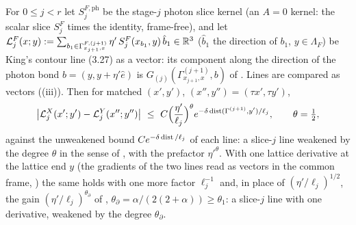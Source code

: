 \begin{lemma}\label{rot:hyb:lem:CLN}
For $0\le j<r$ let $S^{F,\mathrm{ph}}_j$ be the stage-$j$ photon slice kernel (an $A=0$ kernel: the scalar slice $S^F_j$ times the identity, frame-free), and let $\mathcal L^F_j(x;y):=\sum_{b_1\in\Gamma^{F,(j+1)}_{x_{j+1},x}}\eta'\,S^F_j(x_{b_1},y)\,\hat b_1\in\mathbb R^3$ ($\hat b_1$ the direction of $b_1$, $y\in\Lambda_F$) be King's contour line (3.27) as a vector: its component along the direction of the photon bond $b=(y,y+\eta'\hat e)$ is $G_{(j)}(\Gamma^{(j+1)}_{x_{j+1},x},b)$ of \cite[(3.27)]{K1}. Lines are compared as vectors ((iii)). Then for matched $(x',y')$, $(x'',y'')=(\tau x',\tau y')$,
\[
\big|\cL^X_j(x';y')-\cL^Y_j(x'';y'')\big|\ \le\ C\Big(\frac{\eta'}{\ell_j}\Big)^{\theta}e^{-\delta\dist(\Gamma^{(j+1)},y')/\ell_j},\qquad\theta=\tfrac12,
\]
against the unweakened bound $Ce^{-\delta\operatorname{dist}/\ell_j}$ of each line: a slice-$j$ line weakened by the degree $\theta$ in the sense of , with the prefactor $\eta'^\theta$. With one lattice derivative at the lattice end $y$ (the gradients of the two lines read as vectors in the common frame, ) the same holds with one more factor $\ell_j^{-1}$ and, in place of $(\eta'/\ell_j)^{1/2}$, the gain $(\eta'/\ell_j)^{\theta_\partial}$ of , $\theta_\partial=\alpha/(2(2+\alpha))\ge\theta_1$: a slice-$j$ line with one derivative, weakened by the degree $\theta_\partial$.
\end{lemma}
